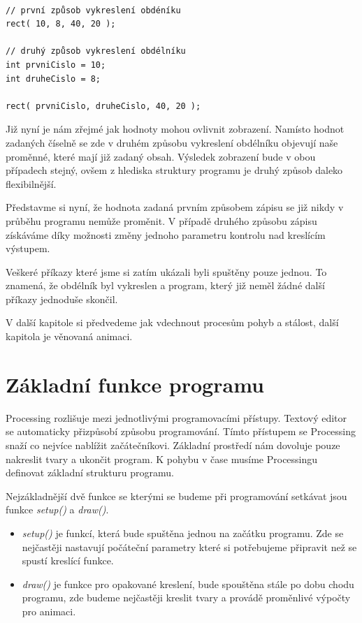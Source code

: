 \documentclass[11pt]{book}
\newcommand{\oddil}[1]{\section{#1}\label{sec:#1}}
\newcommand{\vyraz}[1]{\textit{\gls{#1}}\index{#1}}
\begin{document}
\begin{lstlisting}

// první způsob vykreslení obdéníku
rect( 10, 8, 40, 20 );

// druhý způsob vykreslení obdélníku
int prvniCislo = 10;
int druheCislo = 8;

rect( prvniCislo, druheCislo, 40, 20 );

\end{lstlisting}

Již nyní je nám zřejmé jak hodnoty mohou ovlivnit zobrazení. Namísto hodnot zadaných číselně se zde v druhém způsobu vykreslení obdélníku objevují naše proměnné, které mají již zadaný obsah. Výsledek zobrazení bude v obou případech stejný, ovšem z hlediska struktury programu je druhý způsob daleko flexibilnější.

Představme si nyní, že hodnota zadaná prvním způsobem zápisu se již nikdy v průběhu programu nemůže proměnit. V případě druhého způsobu zápisu získáváme díky možnosti změny jednoho parametru kontrolu nad kreslícím výstupem.

Veškeré příkazy které jsme si zatím ukázali byli spuštěny pouze jednou. To znamená, že obdélník byl vykreslen a program, který již neměl žádné další příkazy jednoduše skončil.

V další kapitole si předvedeme jak vdechnout procesům pohyb a stálost, další kapitola je věnovaná animaci.

\oddil{Základní funkce programu}

Processing rozlišuje mezi jednotlivými programovacími přístupy. Textový editor se automaticky přizpůsobí způsobu programování. Tímto přístupem se Processing snaží co nejvíce nablížit začátečníkovi. Základní prostředí nám dovoluje pouze nakreslit tvary a ukončit program. K pohybu v čase musíme Processingu definovat základní strukturu programu.

Nejzákladnější dvě funkce se kterými se budeme při programování setkávat jsou funkce \vyraz{setup()} a \vyraz{draw()}.

\begin{itemize}
\item
\vyraz{setup()} je funkcí, která bude spuštěna jednou na začátku programu. Zde se nejčastěji nastavují počáteční parametry které si potřebujeme připravit než se spustí kreslící funkce.

\item
\vyraz{draw()} je funkce pro opakované kreslení, bude spouštěna stále po dobu chodu programu, zde budeme nejčastěji kreslit tvary a provádě proměnlivé výpočty pro animaci.
\end{itemize} 
\end{document}
